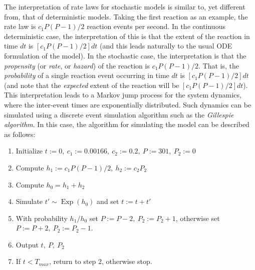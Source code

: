 \clearpage 

The interpretation of rate laws for stochastic models is similar
to, yet different from, that of deterministic models. Taking the
first reaction as an example, the rate law is $c_1P(P-1)/2$ reaction
events per second. In the continuous deterministic case, the
interpretation of this is that the extent of the reaction in time
$dt$ is $[c_1P(P-1)/2]dt$ (and this leads naturally to the usual ODE
formulation of the model). In the stochastic case, the
interpretation is that the \emph{propensity} (or \emph{rate}, or
\emph{hazard}) of the reaction is $c_1P(P-1)/2$. That is, the
\emph{probability} of a single reaction event occurring in time
$dt$ is $[c_1P(P-1)/2]dt$ (and note that the \emph{expected} extent of
the reaction will be $[c_1P(P-1)/2]dt$). This interpretation leads to a Markov
jump process for the system dynamics, where the inter-event times
are exponentially distributed. Such dynamics can be simulated
using a discrete event simulation algorithm such as the
\emph{Gillespie algorithm}. In this case, the algorithm for
simulating the model can be described as follows:

\begin{enumerate}

\item Initialize $t:=0,\ c_1:=0.00166,\ c_2:=0.2,\ P:=301,\ P_2:=0$

\item Compute $h_1:=c_1P(P-1)/2,\ h_2:=c_2P_2$

\item Compute $h_0=h_1+h_2$

\item Simulate $t'\sim \operatorname{Exp}(h_0)$ and set $t:=t+t'$

\item With probability $h_1/h_0$ set $P:=P-2,\ P_2:=P_2+1$,
  otherwise set $P:=P+2,\ P_2:=P_2-1$.

\item Output $t,\ P,\ P_2$

\item If $t<T_{max}$, return to step 2, otherwise stop.

\end{enumerate}

